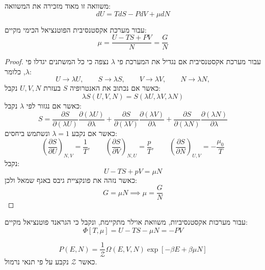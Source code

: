 \documentclass{tstextbook}
\begin{document}
\begin{remark}
משוואה זו מאוד מזכירה את המשוואה:
$$d U=T d S-P d V+\mu d N$$

\end{remark}
\begin{proposition}
עבור מערכת אקסטנסיבית הפוטנציאל הכימי מקיים:
$$\mu= \frac{U-TS+PV}{N}=\frac{G}{N}$$

\end{proposition}
\begin{proof}
עבור מערכת אקסטנסיבית אם נגדיל את המערכת פי \(\lambda\) נצפה כי כל המשתנים יגדלו פי \(\lambda\), כלומר:
$$U\to\lambda U,\qquad S\to\lambda S,\qquad V\to\lambda V,\qquad N\to\lambda N,$$
כאשר אם נכתוב את האנטרופיה \(S\) בעזרת \(U,V,N\) נקבל:
$$\lambda S(U,V,N)=S(\lambda U,\lambda V,\lambda N)$$
כאשר אם נגזור לפי \(\lambda\) נקבל:
$$S=\frac{\partial S}{\partial(\lambda U)}\frac{\partial(\lambda U)}{\partial\lambda}+\frac{\partial S}{\partial(\lambda V)}\frac{\partial(\lambda V)}{\partial\lambda}+\frac{\partial S}{\partial(\lambda N)}\frac{\partial(\lambda N)}{\partial\lambda}$$
כאשר אם נקבע \(\lambda=1\) ונשתמש ביחסים:
$$\left({\frac{\partial S}{\partial U}}\right)_{N,V}={\frac{1}{T}},\qquad\left({\frac{\partial S}{\partial V}}\right)_{N,U}={\frac{p}{T}},\qquad\left({\frac{\partial S}{\partial N}}\right)_{U,V}=-{\frac{\mu_{0}}{T}}$$
נקבל:
$$U-T S+p V=\mu N$$
כאשר נזהה את פונקציית גיבס באגף שמאל ולכן:
$$G=\mu N\implies \mu=\frac{G}{N}$$

\end{proof}
\begin{corollary}
עבור מערכות אקסטנסיביות, משוואת אוילר מתקיימת, ונקבל כי הגראנד פוטנציאל מקיים:
$$\Phi[T,\mu]=U-T S-\mu N=-P V$$

\end{corollary}
\begin{proposition}
$$P(E,N)=\frac{1}{\mathcal{Z}}\Omega(E,V,N)\exp\left[-\beta E+\beta\mu N\right]$$
כאשר \(\mathcal{Z}\) נקבע על פי תנאי נרמול.

\end{proposition}
\end{document}

